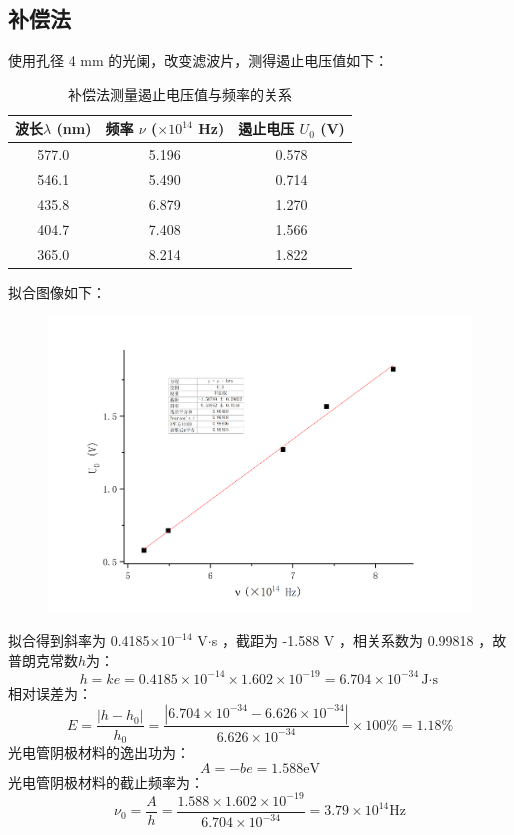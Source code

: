\documentclass[a4paper]{extarticle}
\begin{document}
    \subsection{补偿法}
    使用孔径 4 mm 的光阑，改变滤波片，测得遏止电压值如下：
    \begin{table}[H]
        \centering
        \caption{补偿法测量遏止电压值与频率的关系}
        \begin{tabular}{ccc}
            \toprule
            波长$\lambda$ (nm) & 频率 $\nu$ ($\times10^{14}$ Hz) & 遏止电压 $U_0$ (V)\\
            \midrule
            577.0 & 5.196 & 0.578\\
            546.1 & 5.490 & 0.714\\
            435.8 & 6.879 & 1.270\\
            404.7 & 7.408 & 1.566\\
            365.0 & 8.214 & 1.822\\
            \bottomrule
        \end{tabular}
    \end{table}
    拟合图像如下：
    \begin{figure}[H]
        \centering
        \includegraphics[width=0.8\linewidth]{2.png}
    \end{figure}
    拟合得到斜率为 0.4185$\times10^{-14}$ V$\cdot$s ，截距为 -1.588 V ，相关系数为 0.99818 ，故普朗克常数$h$为：
    \begin{equation*}
        h = ke = 0.4185\times10^{-14} \times 1.602\times10^{-19} = 6.704\times10^{-34} \text{J$\cdot$s}
    \end{equation*}
    相对误差为：
    \begin{equation*}
        E = \frac{|h-h_0|}{h_0} = \frac{|6.704\times10^{-34} - 6.626\times10^{-34}|}{6.626\times10^{-34}} \times 100\% = 1.18\%
    \end{equation*}
    光电管阴极材料的逸出功为：
    \begin{equation*}
        A = -be = 1.588 \text{eV}
    \end{equation*}
    光电管阴极材料的截止频率为：
    \begin{equation*}
        \nu_0 = \frac{A}{h} = \frac{1.588\times1.602\times10^{-19}}{6.704\times10^{-34}} = 3.79\times10^{14} \text{Hz}
    \end{equation*}
\end{document}
